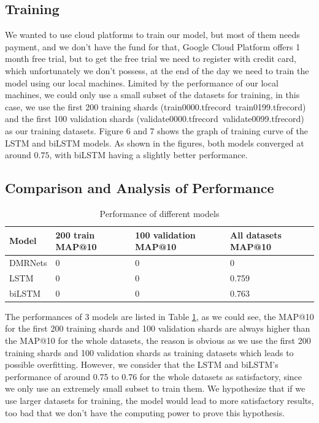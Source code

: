 \documentclass{article}
\begin{document}
\subsection{Training}
We wanted to use cloud platforms to train our model, but most of them needs payment, and we don't have the fund for that, Google Cloud Platform offers 1 month free trial, but to get the free trial we need to register with credit card, which unfortunately we don't possess, at the end of the day we need to train the model using our local machines. Limited by the performance of our local machines, we could only use a small subset of the datasets for training, in this case, we use the first 200 training shards (train0000.tfrecord~train0199.tfrecord) and the first 100 validation shards (validate0000.tfrecord~validate0099.tfrecord) as our training datasets. Figure 6 and 7 shows the graph of training curve of the LSTM and biLSTM models. As shown in the figures, both models converged at around $0.75$, with biLSTM having a slightly better performance.



\subsection{Comparison and Analysis of Performance}
\begin{table} [H]
  \caption{Performance of different models}
  \label{table 1}
  \centering
  \begin{tabular}{llll}
    \toprule
    Model     & 200 train MAP@10     & 100 validation MAP@10 & All datasets MAP@10 \\
    \midrule 
DMRNets & 0  & 0   &0  \\
LSTM & 0  & 0 & 0.759     \\
biLSTM     & 0 & 0 & 0.763      \\
    \bottomrule
  \end{tabular}
\end{table}
The performances of 3 models are listed in Table \ref{table 1}, as we could see, the MAP@10 for the first 200 training shards and 100 validation shards are always higher than the MAP@10 for the whole datasets, the reason is obvious as we use the first 200 training shards and 100 validation shards as training datasets which leads to possible overfitting. However, we consider that the LSTM and biLSTM's performance of around 0.75 to 0.76 for the whole datasets as satisfactory, since we only use an extremely small subset to train them. We hypothesize that if we use larger datasets for training, the model would lead to more satisfactory results, too bad that we don't have the computing power to prove this hypothesis.
\end{document}
